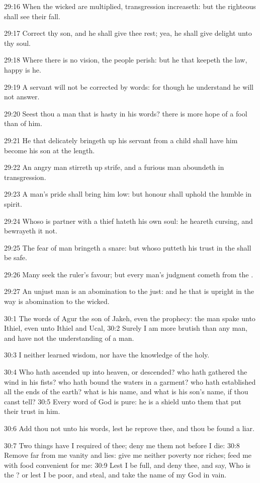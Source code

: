 29:16 When the wicked are multiplied, transgression increaseth: but the righteous shall see their fall.

29:17 Correct thy son, and he shall give thee rest; yea, he shall give delight unto thy soul.

29:18 Where there is no vision, the people perish: but he that keepeth the law, happy is he.

29:19 A servant will not be corrected by words: for though he understand he will not answer.

29:20 Seest thou a man that is hasty in his words? there is more hope of a fool than of him.

29:21 He that delicately bringeth up his servant from a child shall have him become his son at the length.

29:22 An angry man stirreth up strife, and a furious man aboundeth in transgression.

29:23 A man's pride shall bring him low: but honour shall uphold the humble in spirit.

29:24 Whoso is partner with a thief hateth his own soul: he heareth cursing, and bewrayeth it not.

29:25 The fear of man bringeth a snare: but whoso putteth his trust in the \LORD shall be safe.

29:26 Many seek the ruler's favour; but every man's judgment cometh from the \LORD.

29:27 An unjust man is an abomination to the just: and he that is upright in the way is abomination to the wicked.

30:1 The words of Agur the son of Jakeh, even the prophecy: the man spake unto Ithiel, even unto Ithiel and Ucal, 30:2 Surely I am more brutish than any man, and have not the understanding of a man.

30:3 I neither learned wisdom, nor have the knowledge of the holy.

30:4 Who hath ascended up into heaven, or descended? who hath gathered the wind in his fists? who hath bound the waters in a garment? who hath established all the ends of the earth? what is his name, and what is his son's name, if thou canst tell?  30:5 Every word of God is pure: he is a shield unto them that put their trust in him.

30:6 Add thou not unto his words, lest he reprove thee, and thou be found a liar.

30:7 Two things have I required of thee; deny me them not before I die: 30:8 Remove far from me vanity and lies: give me neither poverty nor riches; feed me with food convenient for me: 30:9 Lest I be full, and deny thee, and say, Who is the \LORD? or lest I be poor, and steal, and take the name of my God in vain.

